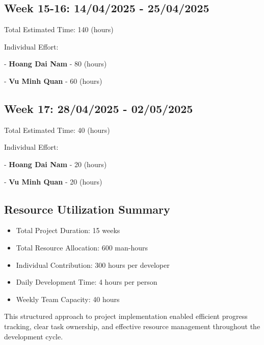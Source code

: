\subsection*{Week 15-16: 14/04/2025 - 25/04/2025} 
Total Estimated Time: 140 (hours)

Individual Effort:

- \textbf{Hoang Dai Nam} - 80 (hours)

- \textbf{Vu Minh Quan} - 60 (hours)
\begin{table}[H]
\centering
{}
\caption{Task breakdown and effort allocation for week 15 and 16}
\end{table}

\subsection*{Week 17: 28/04/2025 - 02/05/2025} 
Total Estimated Time: 40 (hours)

Individual Effort:

- \textbf{Hoang Dai Nam} - 20 (hours)

- \textbf{Vu Minh Quan} - 20 (hours)
\begin{table}[H]
\centering
{}
\caption{Task breakdown and effort allocation for week 17}
\end{table}

\subsection{Resource Utilization Summary}
\begin{itemize}
    \item Total Project Duration: 15 weeks
    \item Total Resource Allocation: 600 man-hours
    \item Individual Contribution: 300 hours per developer
    \item Daily Development Time: 4 hours per person
    \item Weekly Team Capacity: 40 hours
\end{itemize}

This structured approach to project implementation enabled efficient progress tracking, clear task ownership, and effective resource management throughout the development cycle.